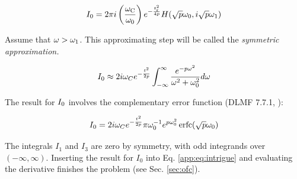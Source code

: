 \documentclass[amsmath,amssymb,aps,prd,10pt,twocolumn]{revtex4}
\DeclareMathOperator\erfc{erfc}
\begin{document}
\begin{equation}
I_{\rm 0} = 2 \pi i \left( \frac{\omega_{\rm C}}{\omega_{\rm 0}} \right) e^{- \frac{t_{\rm r}^2}{4p}} H(\sqrt{p}\omega_0,i\sqrt{p}\omega_1)
\end{equation}

Assume that $\omega > \omega_{\rm 1}$.  This approximating step will be called the \textit{symmetric approximation.}

\begin{equation}
I_{\rm 0} \approx 2 i \omega_C e^{- \frac{t_{\rm}^2}{2p}} \int_{-\infty}^{\infty} \frac{e^{-p\omega^2}}{\omega^2+\omega_0^2}d\omega \label{app:eq:intrigue4}
\end{equation}

The result for $I_{\rm 0}$ involves the complementary error function (DLMF 7.7.1, \cite{NIST:DLMF}):

\begin{equation}
I_{\rm 0} = 2 i \omega_C e^{- \frac{t_{\rm}^2}{2p}} \pi \omega_{\rm 0}^{-1} e^{p \omega_{\rm 0}^2} \erfc(\sqrt{p} \omega_{\rm 0}) \label{app:eq:intrigue5}
\end{equation}

The integrals $I_1$ and $I_3$ are zero by symmetry, with odd integrands over $(-\infty,\infty)$.  Inserting the result for $I_0$ into Eq. \ref{app:eq:intrigue} and evaluating the derivative finishes the problem (see Sec. \ref{sec:ofc}).


\end{document}
